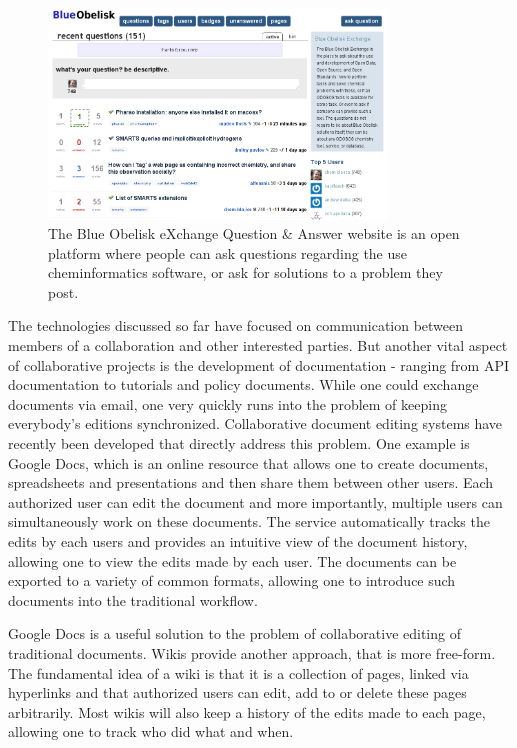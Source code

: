 \documentclass[11pt]{book}
\begin{document}
\begin{figure}[bt]
\begin{center}
\includegraphics[width=0.8\textwidth]{graphics/boShapado.png}
\end{center}
\caption{The Blue Obelisk eXchange Question \& Answer
website is an open platform where people can ask questions regarding
the use cheminformatics software, or ask for solutions
to a problem they post.}
\label{fig:shapado}
\end{figure}

The technologies discussed so far have focused on communication
between members of a collaboration and other interested parties. But
another vital aspect of collaborative projects is the development of
documentation - ranging from API documentation to tutorials and policy
documents. While one could exchange documents via email, one very
quickly runs into the problem of keeping everybody's editions
synchronized. Collaborative document editing systems have recently
been developed that directly address this problem. One example is
Google Docs, which is an online resource that allows one to create
documents, spreadsheets and presentations and then share them between
other users. Each authorized user can edit the document and more
importantly, multiple users can simultaneously work on these
documents. The service automatically tracks the edits by each users and
provides an intuitive view of the document history, allowing one to
view the edits made by each user. The documents can be exported to a
variety of common formats, allowing one to introduce such documents
into the traditional workflow.

Google Docs is a useful solution to the problem of collaborative
editing of traditional documents. Wikis provide another approach, that
is more free-form. The fundamental idea of a wiki is that it is a
collection of pages, linked via hyperlinks and that authorized users
can edit, add to or delete these pages arbitrarily. Most wikis will
also keep a history of the edits made to each page, allowing one to
track who did what and when. 
\end{document}
